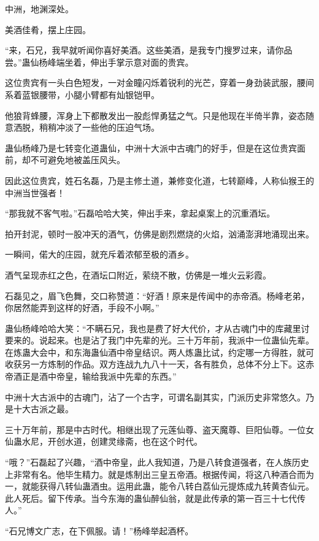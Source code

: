 
\begin{this_body}

中洲，地渊深处。

美酒佳肴，摆上庄园。

“来，石兄，我早就听闻你喜好美酒。这些美酒，是我专门搜罗过来，请你品尝。”蛊仙杨峰端坐着，伸出手掌示意对面的贵宾。

这位贵宾有一头白色短发，一对金瞳闪烁着锐利的光芒，穿着一身劲装武服，腰间系着蓝银腰带，小腿小臂都有灿银铠甲。

他狼背蜂腰，浑身上下都散发出一股彪悍勇猛之气。只是他现在半倚半靠，姿态随意洒脱，稍稍冲淡了一些他的压迫气场。

蛊仙杨峰乃是七转变化道蛊仙，中洲十大派中古魂门的好手，但是在这位贵宾面前，却不可避免地被盖压风头。

因此这位贵宾，姓石名磊，乃是主修土道，兼修变化道，七转巅峰，人称仙猴王的中洲当世强者！

“那我就不客气啦。”石磊哈哈大笑，伸出手来，拿起桌案上的沉重酒坛。

拍开封泥，顿时一股冲天的酒气，仿佛是剧烈燃烧的火焰，汹涌澎湃地涌现出来。

一瞬间，偌大的庄园，就充斥着浓郁至极的酒乡。

酒气呈现赤红之色，在酒坛口附近，萦绕不散，仿佛是一堆火云彩霞。

石磊见之，眉飞色舞，交口称赞道：“好酒！原来是传闻中的赤帝酒。杨峰老弟，你居然能弄到这样的好酒，手段不小啊。”

蛊仙杨峰哈哈大笑：“不瞒石兄，我也是费了好大代价，才从古魂门中的库藏里讨要来的。说起来。也是沾了我门中先辈的光。三十万年前，我派中一位蛊仙先辈。在炼蛊大会中，和东海蛊仙酒中帝皇结识。两人炼蛊比试，约定哪一方得胜，就可收获另一方炼制的作品。双方连战九九八十一天，各有胜负，总体不分上下。这赤帝酒正是酒中帝皇，输给我派中先辈的东西。”

中洲十大古派中的古魂门，沾了一个古字，可谓名副其实，门派历史非常悠久。乃是十大古派之最。

三十万年前，那是中古时代。相继出现了元莲仙尊、盗天魔尊、巨阳仙尊。一位女仙蛊水尼，开创水道，创建灵缘斋，也在这个时代。

“哦？”石磊起了兴趣，“酒中帝皇，此人我知道，乃是八转食道强者，在人族历史上非常有名。他毕生精力。就是炼制出三皇五帝酒。根据传闻，将这八种酒合而为一，就能获得八转仙蛊酒虫。运用此蛊，能令八转白荔仙元提炼成九转黄杏仙元。此人死后。留下传承。当今东海的蛊仙醉仙翁，就是此传承的第一百三十七代传人。”

“石兄博文广志，在下佩服。请！”杨峰举起酒杯。


\end{this_body}
